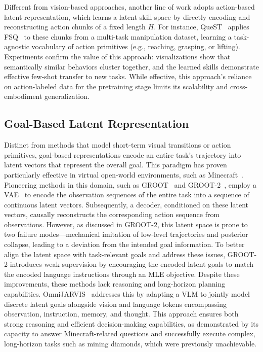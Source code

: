 \documentclass[10pt, a4paper, logo, copyright]{googledeepmind} %
\begin{document}
Different from vision-based approaches, another line of work adopts action-based latent representation, which learns a latent skill space by directly encoding and reconstructing action chunks of a fixed length $H$. For instance, QueST~\cite{mete2024quest} applies FSQ~\cite{mentzer2023finite} to these chunks from a multi-task manipulation dataset, learning a task-agnostic vocabulary of action primitives (e.g., reaching, grasping, or lifting). Experiments confirm the value of this approach: visualizations show that semantically similar behaviors cluster together, and the learned skills demonstrate effective few-shot transfer to new tasks. While effective, this approach's reliance on action-labeled data for the pretraining stage limits its scalability and cross-embodiment generalization.

\subsection{Goal-Based Latent Representation}

Distinct from methods that model short-term visual transitions or action primitives, goal-based representations encode an entire task's trajectory into latent vectors that represent the overall goal. This paradigm has proven particularly effective in virtual open-world environments, such as Minecraft~\cite{cai2024minsstudio}. 
Pioneering methods in this domain, such as GROOT~\cite{cai2023groot} and GROOT-2~\cite{cai2024groot}, employ a VAE~\cite{kingma2013auto} to encode the observation sequences of the entire task into a sequence of continuous latent vectors. Subsequently, a decoder, conditioned on these latent vectors, causally reconstructs the corresponding action sequence from observations. 
However, as discussed in GROOT-2, this latent space is prone to two failure modes---mechanical imitation of low-level trajectories and posterior collapse, leading to a deviation from the intended goal information. To better align the latent space with task-relevant goals and address these issues, GROOT-2 introduces weak supervision by encouraging the encoded latent goals to match the encoded language instructions through an MLE objective.
Despite these improvements, these methods lack reasoning and long-horizon planning capabilities. OmniJARVIS~\cite{wang2024omnijarvis} addresses this by adapting a VLM to jointly model discrete latent goals alongside vision and language tokens encompassing observation, instruction, memory, and thought. This approach ensures both strong reasoning and efficient decision-making capabilities, as demonstrated by its capacity to answer Minecraft-related questions and successfully execute complex, long-horizon tasks such as mining diamonds, which were previously unachievable.
\end{document}
